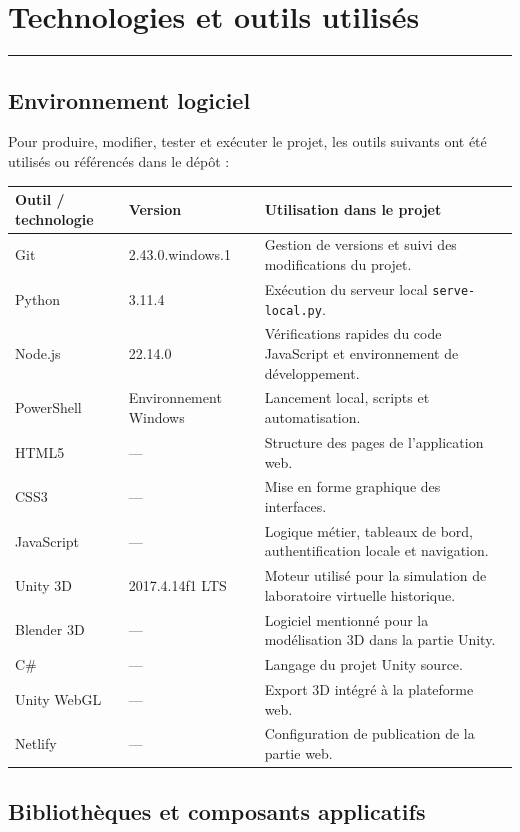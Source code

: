 \documentclass[12pt,a4paper]{report}
\newcommand{\sectionline}{
  \vspace{0.3em}
  \noindent\color{mainline}\rule{\textwidth}{1.5pt}
  \vspace{0.6em}
}
\begin{document}
\section{Technologies et outils utilisés}

\sectionline

\subsection{Environnement logiciel}

Pour produire, modifier, tester et exécuter le projet, les outils suivants ont été utilisés
ou référencés dans le dépôt :

\begin{longtable}{|p{3.2cm}|p{3cm}|p{8.3cm}|}
\hline
\rowcolor{softgray}
\textbf{Outil / technologie} & \textbf{Version} & \textbf{Utilisation dans le projet} \\
\hline
Git & 2.43.0.windows.1 & Gestion de versions et suivi des modifications du projet. \\
\hline
Python & 3.11.4 & Exécution du serveur local \texttt{serve-local.py}. \\
\hline
Node.js & 22.14.0 & Vérifications rapides du code JavaScript et environnement de développement. \\
\hline
PowerShell & Environnement Windows & Lancement local, scripts et automatisation. \\
\hline
HTML5 & --- & Structure des pages de l'application web. \\
\hline
CSS3 & --- & Mise en forme graphique des interfaces. \\
\hline
JavaScript & --- & Logique métier, tableaux de bord, authentification locale et navigation. \\
\hline
Unity 3D & 2017.4.14f1 LTS & Moteur utilisé pour la simulation de laboratoire virtuelle historique. \\
\hline
Blender 3D & --- & Logiciel mentionné pour la modélisation 3D dans la partie Unity. \\
\hline
C\# & --- & Langage du projet Unity source. \\
\hline
Unity WebGL & --- & Export 3D intégré à la plateforme web. \\
\hline
Netlify & --- & Configuration de publication de la partie web. \\
\hline
\end{longtable}

\subsection{Bibliothèques et composants applicatifs}
\end{document}
